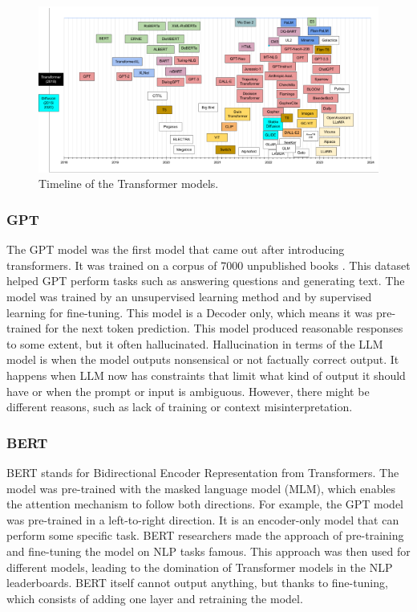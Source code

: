 \begin{figure}[ht]
    \centering
    \includegraphics[width=1\textwidth]{obrazky-figures/llm-history.png}
    \caption{Timeline of the Transformer models.}
    \label{timeline}
\end{figure}


\subsubsection{GPT}

The GPT model was the first model that came out after introducing transformers. It was trained on a corpus of 7000 unpublished books \cite{yenduri2023generative}. This dataset helped GPT perform tasks such as answering questions and generating text. The model was trained by an unsupervised learning method and by supervised learning for fine-tuning. This model is a Decoder only, which means it was pre-trained for the next token prediction. This model produced reasonable responses to some extent, but it often hallucinated. Hallucination in terms of the LLM model is when the model outputs nonsensical or not factually correct output. It happens when LLM now has constraints that limit what kind of output it should have or when the prompt or input is ambiguous. However, there might be different reasons, such as lack of training or context misinterpretation. 

\subsubsection{BERT}

BERT stands for Bidirectional Encoder Representation from Transformers. The model was pre-trained with the masked language model (MLM), which enables the attention mechanism to follow both directions. For example, the GPT model was pre-trained in a left-to-right direction. It is an encoder-only model that can perform some specific task. BERT researchers made the approach of pre-training and fine-tuning the model on NLP tasks famous. This approach was then used for different models, leading to the domination of Transformer models in the NLP leaderboards. BERT itself cannot output anything, but thanks to fine-tuning, which consists of adding one layer and retraining the model. \cite{devlin2019bert}


